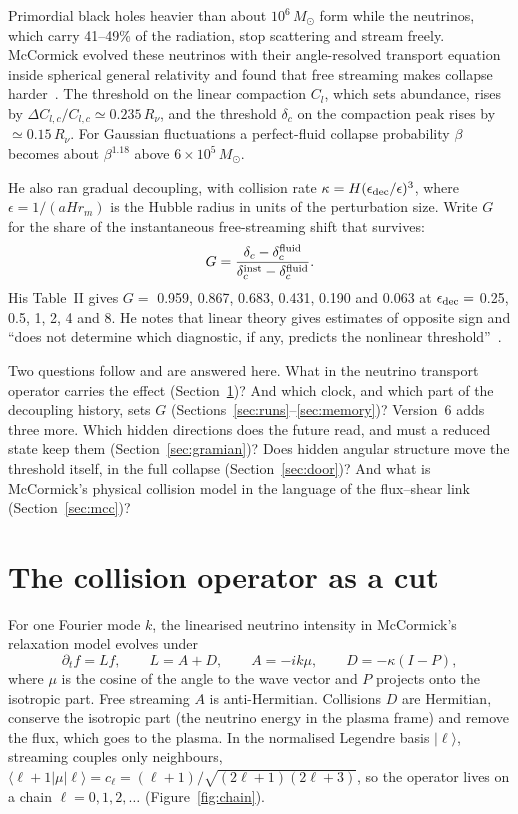 \documentclass[11pt]{article}
\begin{document}
Primordial black holes heavier than about $10^6\,M_\odot$ form while the neutrinos, which carry 41--49\% of the radiation, stop scattering and stream freely. McCormick evolved these neutrinos with their angle-resolved transport equation inside spherical general relativity and found that free streaming makes collapse harder~\cite{McC}. The threshold on the linear compaction $C_l$, which sets abundance, rises by $\Delta C_{l,c}/C_{l,c}\simeq0.235\,R_\nu$, and the threshold $\delta_c$ on the compaction peak rises by $\simeq0.15\,R_\nu$. For Gaussian fluctuations a perfect-fluid collapse probability $\beta$ becomes about $\beta^{1.18}$ above $6\times10^5\,M_\odot$.

He also ran gradual decoupling, with collision rate $\kappa=H(\epsilon_{\rm dec}/\epsilon)^3$, where $\epsilon=1/(aHr_m)$ is the Hubble radius in units of the perturbation size. Write $G$ for the share of the instantaneous free-streaming shift that survives:
\begin{equation}
G=\frac{\delta_c-\delta_c^{\rm fluid}}{\delta_c^{\rm inst}-\delta_c^{\rm fluid}}.
\end{equation}
His Table~II gives $G=$ 0.959, 0.867, 0.683, 0.431, 0.190 and 0.063 at $\epsilon_{\rm dec}=$ 0.25, 0.5, 1, 2, 4 and 8. He notes that linear theory gives estimates of opposite sign and ``does not determine which diagnostic, if any, predicts the nonlinear threshold''~\cite[Sec.~IV\,C]{McC}.

Two questions follow and are answered here. What in the neutrino transport operator carries the effect (Section~\ref{sec:cut})? And which clock, and which part of the decoupling history, sets $G$ (Sections~\ref{sec:runs}--\ref{sec:memory})? Version~6 adds three more. Which hidden directions does the future read, and must a reduced state keep them (Section~\ref{sec:gramian})? Does hidden angular structure move the threshold itself, in the full collapse (Section~\ref{sec:door})? And what is McCormick's physical collision model in the language of the flux--shear link (Section~\ref{sec:mcc})?



\section{The collision operator as a cut}\label{sec:cut}

For one Fourier mode $k$, the linearised neutrino intensity in McCormick's relaxation model evolves under
\begin{equation}
\partial_t f=L f,\qquad L=A+D,\qquad A=-ik\mu,\qquad D=-\kappa(I-P),
\end{equation}
where $\mu$ is the cosine of the angle to the wave vector and $P$ projects onto the isotropic part. Free streaming $A$ is anti-Hermitian. Collisions $D$ are Hermitian, conserve the isotropic part (the neutrino energy in the plasma frame) and remove the flux, which goes to the plasma. In the normalised Legendre basis $|\ell\rangle$, streaming couples only neighbours, $\langle\ell+1|\mu|\ell\rangle=c_\ell=(\ell+1)/\sqrt{(2\ell+1)(2\ell+3)}$, so the operator lives on a chain $\ell=0,1,2,\dots$ (Figure~\ref{fig:chain}).
\end{document}
